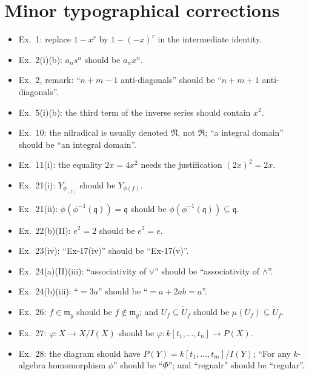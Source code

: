\documentclass[11pt]{article}
\newcommand{\fm}{\mathfrak m}
\newcommand{\fq}{\mathfrak q}
\begin{document}
\section*{Minor typographical corrections}

\begin{itemize}[leftmargin=1.5em]
  \item Ex.~1: replace \(1-x^r\) by \(1-(-x)^r\) in the intermediate identity.
  \item Ex.~2(i)(b): \(a_ns^n\) should be \(a_nx^n\).
  \item Ex.~2, remark: ``\(n+m-1\) anti-diagonals'' should be
        ``\(n+m+1\) anti-diagonals''.
  \item Ex.~5(i)(b): the third term of the inverse series should contain
        \(x^2\).
  \item Ex.~10: the nilradical is usually denoted \(\mathfrak N\), not
        \(\mathfrak R\); ``a integral domain'' should be ``an integral
        domain''.
  \item Ex.~11(i): the equality \(2x=4x^2\) needs the justification
        \((2x)^2=2x\).
  \item Ex.~21(i): \(Y_{\phi_{(f)}}\) should be \(Y_{\phi(f)}\).
  \item Ex.~21(ii): \(\phi(\phi^{-1}(\fq))=\fq\) should be
        \(\phi(\phi^{-1}(\fq))\subseteq\fq\).
  \item Ex.~22(b)(II): \(e^2=2\) should be \(e^2=e\).
  \item Ex.~23(iv): ``Ex-17(iv)'' should be ``Ex-17(v)''.
  \item Ex.~24(a)(II)(iii): ``associativity of \(\vee\)'' should be
        ``associativity of \(\wedge\)''.
  \item Ex.~24(b)(iii): ``\(=3a\)'' should be ``\(=a+2ab=a\)''.
  \item Ex.~26: \(f\in\fm_y\) should be \(f\notin\fm_y\); and
        \(U_f\subseteq\widetilde U_f\) should be
        \(\mu(U_f)\subseteq\widetilde U_f\).
  \item Ex.~27: \(\varphi:X\to X/I(X)\) should be
        \(\varphi:k[t_1,\ldots,t_n]\to P(X)\).
  \item Ex.~28: the diagram should have
        \(P(Y)=k[t_1,\ldots,t_m]/I(Y)\); ``For any \(k\)-algebra
        homomorphism \(\phi\)'' should be ``\(\Phi\)''; and ``regualr''
        should be ``regular''.
\end{itemize}
\end{document}
